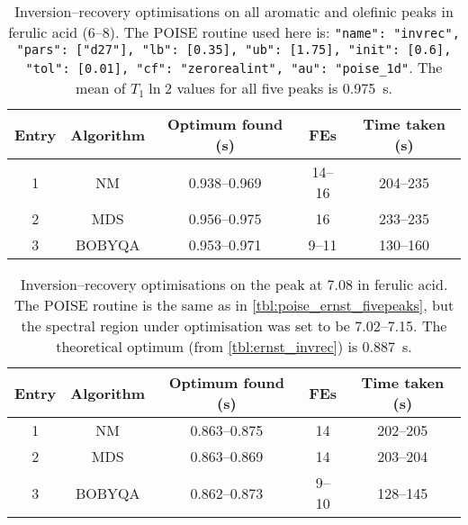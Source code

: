 \begin{table}[htb]
    \centering
    \begin{tabular}{ccccc}
        \toprule
        Entry & Algorithm & Optimum found (\unit{\s}) & FEs    & Time taken (\unit{\s}) \\
        \midrule
        1     & NM        & 0.938--0.969            & 14--16 & 204--235             \\
        2     & MDS       & 0.956--0.975            & 16     & 233--235             \\
        3     & BOBYQA    & 0.953--0.971            & 9--11  & 130--160             \\
        \bottomrule
    \end{tabular}
    \caption[Inversion--recovery optimisations on a range of peaks]{
        Inversion--recovery optimisations on all aromatic and olefinic peaks in ferulic acid (\qtyrange{6}{8}{\ppm}).
        The POISE routine used here is: \texttt{{"name": "invrec", "pars": ["d27"], "lb": [0.35], "ub": [1.75], "init": [0.6], "tol": [0.01], "cf": "zerorealint", "au": "poise_1d"}}.
        The mean of $T_1 \ln 2$ values for all five peaks is \qty{0.975}{\s}.
    }
    \label{tbl:invrec_fivepeaks}
\end{table}

\begin{table}[htb]
    \centering
    \begin{tabular}{ccccc}
        \toprule
        Entry & Algorithm & Optimum found (\unit{\s}) & FEs   & Time taken (\unit{\s}) \\
        \midrule
        1     & NM        & 0.863--0.875            & 14    & 202--205             \\
        2     & MDS       & 0.863--0.869            & 14    & 203--204             \\
        3     & BOBYQA    & 0.862--0.873            & 9--10 & 128--145             \\
        \bottomrule
    \end{tabular}
    \caption[Inversion--recovery optimisations on only one peak]{
        Inversion--recovery optimisations on the peak at \qty{7.08}{\ppm} in ferulic acid.
        The POISE routine is the same as in \cref{tbl:poise_ernst_fivepeaks}, but the spectral region under optimisation was set to be 7.02--\qty{7.15}{\ppm}.
        The theoretical optimum (from \cref{tbl:ernst_invrec}) is \qty{0.887}{\s}.
    }
    \label{tbl:invrec_onepeak}
\end{table}

